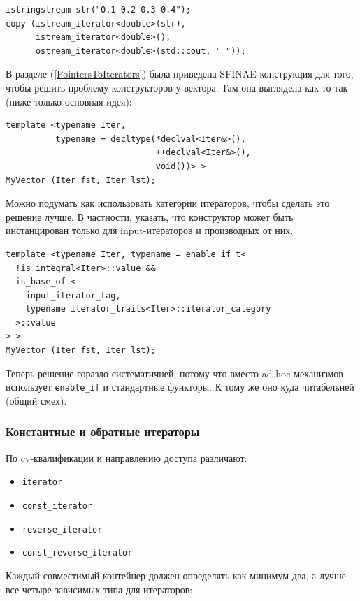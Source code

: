\documentclass[a4paper,12pt,oneside]{article}
\begin{document}
\begin{lstlisting}
istringstream str("0.1 0.2 0.3 0.4");
copy (istream_iterator<double>(str),
      istream_iterator<double>(),
      ostream_iterator<double>(std::cout, " "));
\end{lstlisting}

В разделе (\ref{PointersToIterators}) была приведена SFINAE-конструкция для того, чтобы решить проблему конструкторов у вектора. Там она выглядела как-то так (ниже только основная идея):

\begin{lstlisting}
template <typename Iter, 
          typename = decltype(*declval<Iter&>(),
                              ++declval<Iter&>(), 
                              void())> >
MyVector (Iter fst, Iter lst);
\end{lstlisting}

Можно подумать как использовать категории итераторов, чтобы сделать это решение лучше. В частности, указать, что конструктор может быть инстанцирован только для input-итераторов и производных от них.

\begin{lstlisting}
template <typename Iter, typename = enable_if_t<
  !is_integral<Iter>::value &&
  is_base_of <
    input_iterator_tag, 
    typename iterator_traits<Iter>::iterator_category
  >::value
> >
MyVector (Iter fst, Iter lst);
\end{lstlisting}

Теперь решение гораздо систематичней, потому что вместо ad-hoc механизмов использует \lstinline!enable_if! и стандартные функторы. К тому же оно куда читабельней (общий смех).

\subsubsection{Константные и обратные итераторы}\label{subsub:constrev}

По cv-квалификации и направлению доступа различают:

\begin{itemize}
\item \lstinline!iterator!
\item \lstinline!const_iterator!
\item \lstinline!reverse_iterator!
\item \lstinline!const_reverse_iterator!
\end{itemize}

Каждый совместимый контейнер должен определять как минимум два, а лучше все четыре зависимых типа для итераторов:
\end{document}
